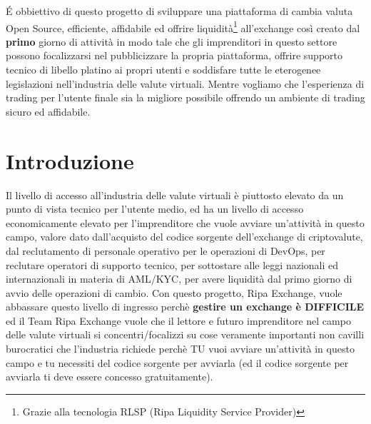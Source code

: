 \documentclass[11pt,fleqn,oneside]{book} %
\begin{document}
É obbiettivo di questo progetto di sviluppare una piattaforma di cambia valuta Open Source, efficiente, affidabile ed 
offrire liquidità\footnote{Grazie alla tecnologia RLSP (Ripa Liquidity Service Provider)} all'exchange così creato dal \textbf{primo}
giorno di attività in modo tale che gli imprenditori in questo settore possono focalizzarsi nel pubblicizzare la propria piattaforma,
offrire supporto tecnico di libello platino ai propri utenti e soddisfare tutte le eterogenee legislazioni nell'industria delle valute virtuali.
Mentre vogliamo che l'esperienza di trading per l'utente finale sia la migliore possibile offrendo un ambiente di trading sicuro ed affidabile.\\
\usechapterimagetrue


\renewcommand*\contentsname{Indice dei Contenuti}
\tableofcontents %






\chapter{Introduzione}
Il livello di accesso all'industria delle valute virtuali è piuttosto elevato da un punto di vista tecnico per l'utente medio, 
ed ha un livello di accesso economicamente elevato per l'imprenditore che vuole avviare un'attività in questo campo, valore dato 
dall'acquisto del codice sorgente dell'exchange di criptovalute, dal reclutamento di personale operativo per le operazioni di DevOps,
per reclutare operatori di supporto tecnico, per sottostare alle leggi nazionali ed internazionali in materia di AML/KYC, per avere liquidità
dal primo giorno di avvio delle operazioni di cambio. Con questo progetto, Ripa Exchange, vuole abbassare questo livello di ingresso 
perchè \textbf{gestire un exchange è DIFFICILE} ed il Team Ripa Exchange vuole che il lettore e futuro imprenditore nel campo delle valute
virtuali si concentri/focalizzi su cose veramente importanti non cavilli burocratici che l'industria richiede perchè TU vuoi avviare un'attività
in questo campo e tu necessiti del codice sorgente per avviarla (ed il codice sorgente per avviarla ti deve essere concesso gratuitamente).
\end{document}

